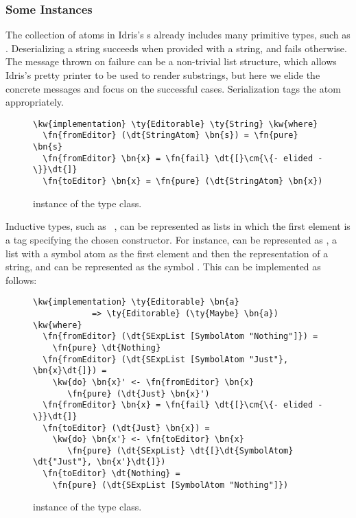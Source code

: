 \subsubsection{Some \Editorable{} Instances}

The collection of atoms in Idris's \sexp{}s already includes many
primitive types, such as .  Deserializing a string succeeds
when provided with a string, and fails otherwise. The message thrown on failure can be a non-trivial list structure, which allows Idris's pretty printer to be used to render substrings, but here we elide the concrete messages and focus on the successful cases.
Serialization tags
the atom appropriately.

\begin{figure}[H]
\begin{Verbatim}
\kw{implementation} \ty{Editorable} \ty{String} \kw{where}
  \fn{fromEditor} (\dt{StringAtom} \bn{s}) = \fn{pure} \bn{s}
  \fn{fromEditor} \bn{x} = \fn{fail} \dt{[}\cm{\{- elided -\}}\dt{]}
  \fn{toEditor} \bn{x} = \fn{pure} (\dt{StringAtom} \bn{x})
\end{Verbatim}
\caption{ instance of the  type class.}
\label{code:editorableString}
\end{figure}

Inductive types, such as \mbox{ }, can be represented as lists in which the first element is a tag specifying the chosen constructor.
For instance,  can be represented as , a list
\sexp{} with a symbol atom as the first element and then the \sexp{}
representation of a string, and  can be represented as
the symbol . This can be implemented as follows:

\begin{figure}[H]
\begin{Verbatim}
\kw{implementation} \ty{Editorable} \bn{a}
            => \ty{Editorable} (\ty{Maybe} \bn{a}) \kw{where}
  \fn{fromEditor} (\dt{SExpList [SymbolAtom "Nothing"]}) =
    \fn{pure} \dt{Nothing}
  \fn{fromEditor} (\dt{SExpList [SymbolAtom "Just"}, \bn{x}\dt{]}) =
    \kw{do} \bn{x}' <- \fn{fromEditor} \bn{x}
       \fn{pure} (\dt{Just} \bn{x}')
  \fn{fromEditor} \bn{x} = \fn{fail} \dt{[}\cm{\{- elided -\}}\dt{]}
  \fn{toEditor} (\dt{Just} \bn{x}) =
    \kw{do} \bn{x'} <- \fn{toEditor} \bn{x}
       \fn{pure} (\dt{SExpList} \dt{[}\dt{SymbolAtom} \dt{"Just"}, \bn{x'}\dt{]})
  \fn{toEditor} \dt{Nothing} =
    \fn{pure} (\dt{SExpList [SymbolAtom "Nothing"]})
\end{Verbatim}
\label{code:editorableMaybe}
\caption{ instance of the  type class.}
\end{figure}

